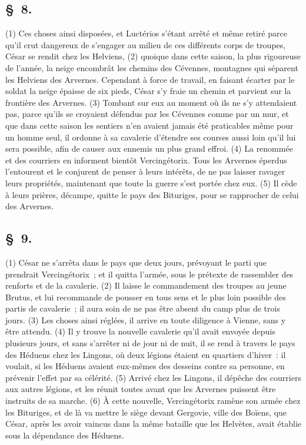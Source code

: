 \documentclass[french,twoside]{book} %
\begin{document}
\subsection[{§ 8.}]{ \textsc{§ 8.} }
\noindent (1) Ces choses ainsi disposées, et Luctérios s’étant arrêté et même retiré parce qu’il crut dangereux de s’engager au milieu de ces différents corps de troupes, César se rendit chez les Helviens, (2) quoique dans cette saison, la plus rigoureuse de l’année, la neige encombrât les chemins des Cévennes, montagnes qui séparent les Helviens des Arvernes. Cependant à force de travail, en faisant écarter par le soldat la neige épaisse de six pieds, César s’y fraie un chemin et parvient sur la frontière des Arvernes. (3) Tombant sur eux au moment où ils ne s’y attendaient pas, parce qu’ils se croyaient défendus par les Cévennes comme par un mur, et que dans cette saison les sentiers n’en avaient jamais été praticables même pour un homme seul, il ordonne à sa cavalerie d’étendre ses courses aussi loin qu’il lui sera possible, afin de causer aux ennemis un plus grand effroi. (4) La renommée et des courriers en informent bientôt Vercingétorix. Tous les Arvernes éperdus l’entourent et le conjurent de penser à leurs intérêts, de ne pas laisser ravager leurs propriétés, maintenant que toute la guerre s’est portée chez eux. (5) Il cède à leurs prières, décampe, quitte le pays des Bituriges, pour se rapprocher de celui des Arvernes.
\subsection[{§ 9.}]{ \textsc{§ 9.} }
\noindent (1) César ne s’arrêta dans le pays que deux jours, prévoyant le parti que prendrait Vercingétorix ; et il quitta l’armée, sous le prétexte de rassembler des renforts et de la cavalerie. (2) Il laisse le commandement des troupes au jeune Brutus, et lui recommande de pousser en tous sens et le plus loin possible des partis de cavalerie ; il aura soin de ne pas être absent du camp plus de trois jours. (3) Les choses ainsi réglées, il arrive en toute diligence à Vienne, sans y être attendu. (4) Il y trouve la nouvelle cavalerie qu’il avait envoyée depuis plusieurs jours, et sans s’arrêter ni de jour ni de nuit, il se rend à travers le pays des Héduens chez les Lingons, où deux légions étaient en quartiers d’hiver : il voulait, si les Héduens avaient eux-mêmes des desseins contre sa personne, en prévenir l’effet par sa célérité. (5) Arrivé chez les Lingons, il dépêche des courriers aux autres légions, et les réunit toutes avant que les Arvernes puissent être instruits de sa marche. (6) À cette nouvelle, Vercingétorix ramène son armée chez les Bituriges, et de là va mettre le siège devant Gergovie, ville des Boïens, que César, après les avoir vaincus dans la même bataille que les Helvètes, avait établie sous la dépendance des Héduens.
\end{document}
